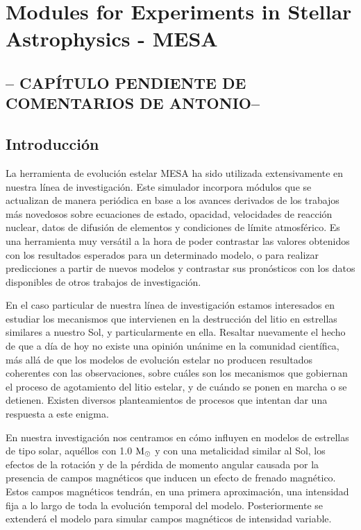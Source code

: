 
\chapter{Modules for Experiments in Stellar Astrophysics - MESA}\label{ch:cuarto-capitulo}
\section{-- CAPÍTULO PENDIENTE DE COMENTARIOS DE ANTONIO--}
\section{Introducción}
La herramienta de evolución estelar MESA ha sido utilizada extensivamente en nuestra línea de investigación. Este simulador incorpora módulos que se actualizan de manera periódica en base a los avances derivados de los trabajos más novedosos sobre ecuaciones de estado, opacidad, velocidades de reacción nuclear, datos de difusión de elementos y condiciones de límite atmosférico. Es una herramienta muy versátil a la hora de poder contrastar las valores obtenidos con los resultados esperados para un determinado modelo, o para realizar predicciones a partir de nuevos modelos y contrastar sus pronósticos con los datos disponibles de otros trabajos de investigación.\par

En el caso particular de nuestra línea de investigación estamos interesados en estudiar los mecanismos que intervienen en la destrucción del litio en estrellas similares a nuestro Sol, y particularmente en ella. Resaltar nuevamente el hecho de que a día de hoy no existe una opinión unánime en la comunidad científica, más allá de que los modelos de evolución estelar no producen resultados coherentes con las observaciones, sobre cuáles son los mecanismos que gobiernan el proceso de agotamiento del litio estelar, y de cuándo se ponen en marcha o se detienen. Existen diversos planteamientos de procesos que intentan dar una respuesta a este enigma.\par 

En nuestra investigación nos centramos en cómo influyen en modelos de estrellas de tipo solar, aquéllos con 1.0 $\mathrm{M}_\odot$ y con una metalicidad similar al Sol, los efectos de la rotación y de la pérdida de momento angular causada por la presencia de campos magnéticos que inducen un efecto de frenado magnético. Estos campos magnéticos tendrán, en una primera aproximación, una intensidad fija a lo largo de toda la evolución temporal del modelo. Posteriormente se extenderá el modelo para simular campos magnéticos de intensidad variable.\par

